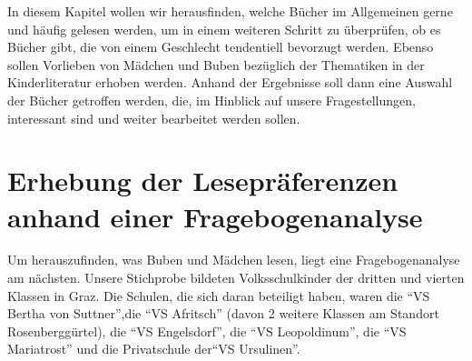 In diesem Kapitel wollen wir herausfinden, welche Bücher im Allgemeinen
gerne und häufig gelesen werden, um in einem weiteren Schritt zu
überprüfen, ob es Bücher gibt, die von einem Geschlecht tendentiell
bevorzugt werden. Ebenso sollen Vorlieben von Mädchen und Buben
bezüglich der Thematiken in der Kinderliteratur erhoben werden. Anhand
der Ergebnisse soll dann eine Auswahl der Bücher getroffen werden, die,
im Hinblick auf unsere Fragestellungen, interessant sind und weiter
bearbeitet werden sollen.

\section{Erhebung der Lesepräferenzen anhand einer Fragebogenanalyse}

Um herauszufinden, was Buben und Mädchen lesen, liegt eine
Fragebogenanalyse am nächsten. Unsere Stichprobe bildeten
Volksschulkinder der dritten und vierten Klassen in Graz. Die Schulen,
die sich daran beteiligt haben, waren die ``VS Bertha von Suttner'',die
``VS Afritsch'' (davon 2 weitere Klassen am Standort Rosenberggürtel),
die ``VS Engelsdorf'', die ``VS Leopoldinum'', die ``VS Mariatrost'' und
die Privatschule der``VS Ursulinen''.

